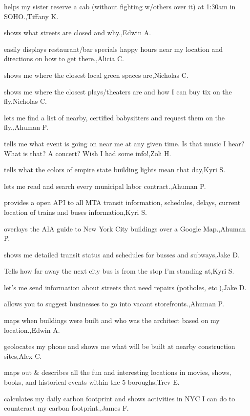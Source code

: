 \documentclass{article}
\begin{document}
helps my sister reserve a cab (without fighting w/others over it) at 1:30am in SOHO.,Tiffany K.

shows what streets are closed and why.,Edwin A.

easily displays restaurant/bar specials happy hours near my location and directions on how to get there.,Alicia C.

shows me where the closest local green spaces are,Nicholas C.

shows me where the closest plays/theaters are and how I can buy tix on the fly,Nicholas C.

lets me find a list of nearby, certified babysitters and request them on the fly.,Ahuman P.

tells me what event is going on near me at any given time. Is that music I hear? What is that? A concert? Wish I had some info!,Zoli H.

tells what the colors of empire state building lights mean that day,Kyri S.

lets me read and search every municipal labor contract.,Ahuman P.

provides a open API to all MTA transit information, schedules, delays, current location of trains and buses  information,Kyri S.

overlays the AIA guide to New York City buildings over a Google Map.,Ahuman P.

shows me detailed transit status and schedules for busses and subways,Jake D.

Tells how far away the next city bus is from the stop I'm standing at,Kyri S.

let's me send information about streets that need repairs (potholes, etc.),Jake D.

allows you to suggest businesses to go into vacant storefronts.,Ahuman P.

maps when buildings were built and who was the architect based on my location.,Edwin A.

geolocates my phone and shows me what will be built at nearby construction sites,Alex C.

maps out \& describes all the fun and interesting locations in movies, shows, books, and historical events within the 5 boroughs,Trev E.

calculates my daily carbon footprint and shows activities in NYC I can do to counteract my carbon footprint.,James F.
\end{document}
